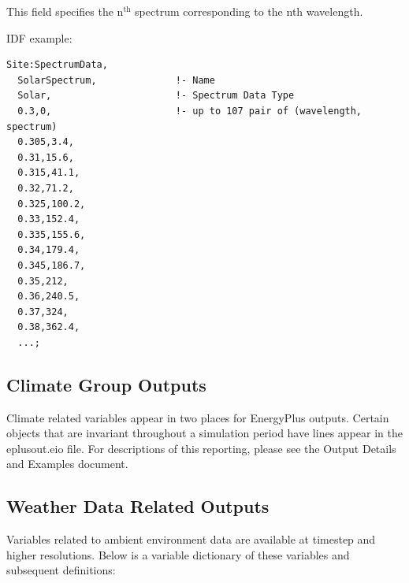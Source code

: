 This field specifies the n$^\textrm{th}$ spectrum corresponding to the nth wavelength.

IDF example:

\begin{lstlisting}
Site:SpectrumData,
  SolarSpectrum,              !- Name
  Solar,                      !- Spectrum Data Type
  0.3,0,                      !- up to 107 pair of (wavelength, spectrum)
  0.305,3.4,
  0.31,15.6,
  0.315,41.1,
  0.32,71.2,
  0.325,100.2,
  0.33,152.4,
  0.335,155.6,
  0.34,179.4,
  0.345,186.7,
  0.35,212,
  0.36,240.5,
  0.37,324,
  0.38,362.4,
  ...;
\end{lstlisting}

\subsection{Climate Group Outputs}\label{outputs-3-011}

Climate related variables appear in two places for EnergyPlus outputs. Certain objects that are invariant throughout a simulation period have lines appear in the eplusout.eio file. For descriptions of this reporting, please see the Output Details and Examples document.

\subsection{Weather Data Related Outputs}\label{outputs-4-008}

Variables related to ambient environment data are available at timestep and higher resolutions. Below is a variable dictionary of these variables and subsequent definitions:

